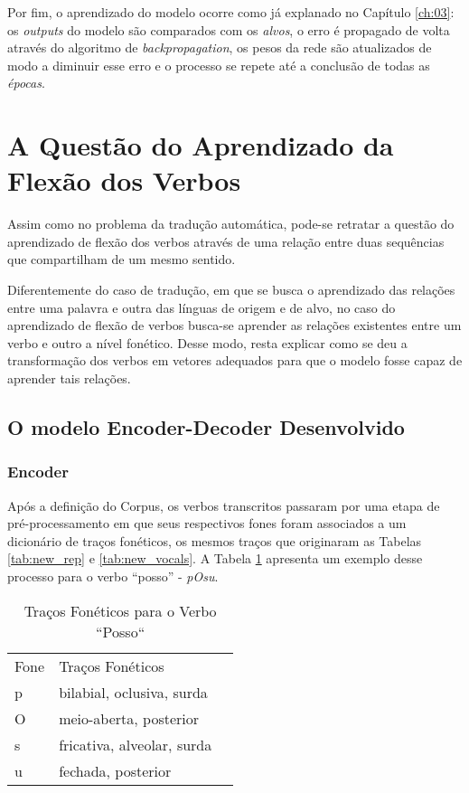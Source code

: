  
 
 Por fim, o aprendizado do modelo ocorre como já explanado no Capítulo \ref{ch:03}: os \textit{outputs} do modelo são comparados com os \textit{alvos}, o erro é propagado de volta através do algoritmo de \textit{backpropagation}, os pesos da rede são atualizados de modo a diminuir esse erro e o processo se repete até a conclusão de todas as \textit{épocas}.
 
\section{A Questão do Aprendizado da Flexão dos Verbos}

Assim como no problema da tradução automática, pode-se retratar a questão do aprendizado de flexão dos verbos através de uma relação entre duas sequências que compartilham de um mesmo sentido.



Diferentemente do caso de tradução, em que se busca o aprendizado das relações entre uma palavra e outra das línguas de origem e de alvo, no caso do aprendizado de flexão de verbos busca-se aprender as relações existentes entre um verbo e outro a nível fonético. Desse modo, resta explicar como se deu a transformação dos verbos em vetores adequados para que o modelo fosse capaz de aprender tais relações.



\subsection{O modelo Encoder-Decoder Desenvolvido}

\subsubsection{Encoder}
\label{sec:inputs}

Após a definição do Corpus, os verbos transcritos passaram por uma etapa de pré-processamento em que seus respectivos fones foram associados a um dicionário de traços fonéticos, os mesmos traços que originaram as Tabelas \ref{tab:new_rep} e \ref{tab:new_vocals}. A Tabela \ref{tab:pOsu} apresenta um exemplo desse processo para o verbo “posso” - \textit{pOsu}. 

\begin{table}[H]
\begin{center}
\begin{tabular}{lll}
Fone & Traços Fonéticos &  \\ \cline{1-2}
p & bilabial, oclusiva, surda &  \\
O & meio-aberta, posterior &  \\
s & fricativa, alveolar, surda &  \\
u & fechada, posterior & 
\end{tabular}
\end{center}
\caption{Traços Fonéticos para o Verbo “Posso“}
\label{tab:pOsu}
\end{table}

